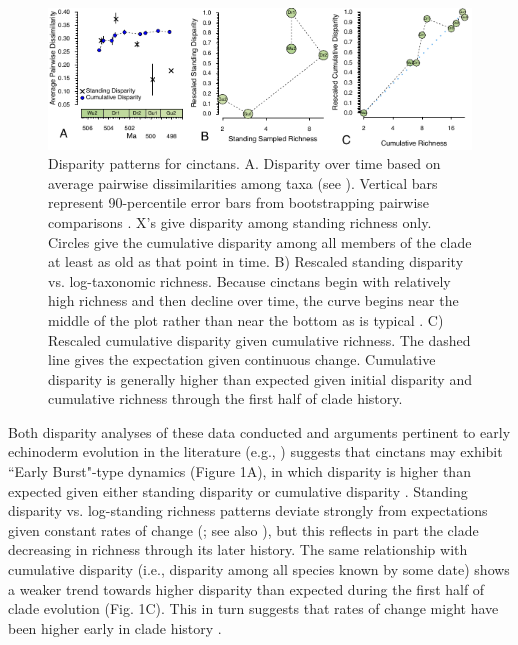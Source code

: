 \documentclass{article}
\begin{document}
\begin{figure}
  \includegraphics[width=\textwidth]{figures/Cinctan Disparity 3Ways Horizontal.pdf}

  \caption{Disparity patterns for cinctans.  A. Disparity over time based on average pairwise dissimilarities among taxa (see \cite{Foote1992}).  Vertical bars represent 90-percentile error bars from bootstrapping pairwise comparisons \citep{Foote1993}.  X’s give disparity among standing richness only.  Circles give the cumulative disparity among all members of the clade at least as old as that point in time.  B) Rescaled standing disparity vs. log-taxonomic richness. Because cinctans begin with relatively high richness and then decline over time, the curve begins near the middle of the plot rather than near the bottom as is typical \citep{Jablonski2020}. C) Rescaled cumulative disparity given cumulative richness.  The dashed line gives the expectation given continuous change.  Cumulative disparity is generally higher than expected given initial disparity and cumulative richness through the first half of clade history.}
\end{figure}

Both disparity analyses of these data conducted and arguments pertinent to early echinoderm evolution in the literature (e.g., \citealp{SmithEtAl2013}) suggests that cinctans may exhibit ``Early Burst"-type dynamics (Figure 1A), in which disparity is higher than expected given either standing disparity \citep{Hughes2013} or cumulative disparity \citep{Wagner2015} .  Standing disparity vs. log-standing richness patterns deviate strongly from expectations given constant rates of change (\cite*{Jablonski2020}; see also \cite{Wright2017}), but this reflects in part the clade decreasing in richness through its later history.  The same relationship with cumulative disparity (i.e., disparity among all species known by some date) shows a weaker trend towards higher disparity than expected during the first half of clade evolution (Fig. 1C).  This in turn suggests that rates of change might have been higher early in clade history \citep{Foote1996b}. 
\end{document}

